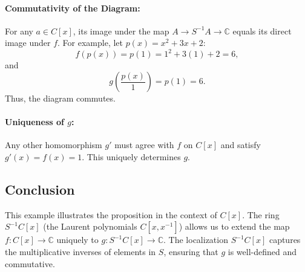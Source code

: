 \documentclass[11pt,openany]{article}
\begin{document}
\paragraph{Commutativity of the Diagram:} For any \( a \in C[x] \), its image under the map \( A \to S^{-1}A \to \mathbb{C} \) equals its direct image under \( f \). For example, let \( p(x) = x^2 + 3x + 2 \):
\[
f(p(x)) = p(1) = 1^2 + 3(1) + 2 = 6,
\]
and
\[
g\left(\frac{p(x)}{1}\right) = p(1) = 6.
\]
Thus, the diagram commutes.

\paragraph{Uniqueness of \( g \):} Any other homomorphism \( g' \) must agree with \( f \) on \( C[x] \) and satisfy \( g'(x) = f(x) = 1 \). This uniquely determines \( g \).

\subsection*{Conclusion}
This example illustrates the proposition in the context of \( C[x] \). The ring \( S^{-1}C[x] \) (the Laurent polynomials \( C[x, x^{-1}] \)) allows us to extend the map \( f : C[x] \to \mathbb{C} \) uniquely to \( g : S^{-1}C[x] \to \mathbb{C} \). The localization \( S^{-1}C[x] \) captures the multiplicative inverses of elements in \( S \), ensuring that \( g \) is well-defined and commutative.




%	
%	
%	
%	
\end{document}
